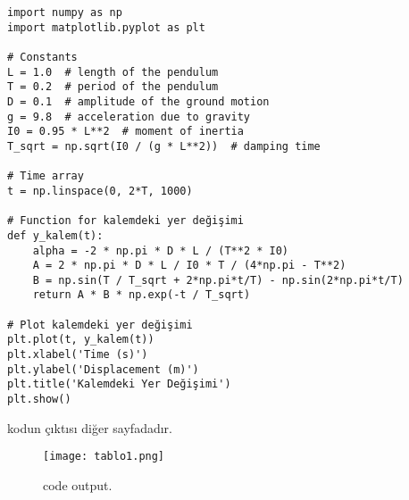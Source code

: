 \documentclass[12pt]{article}
\begin{document}
\begin{verbatim}
import numpy as np
import matplotlib.pyplot as plt

# Constants
L = 1.0  # length of the pendulum
T = 0.2  # period of the pendulum
D = 0.1  # amplitude of the ground motion
g = 9.8  # acceleration due to gravity
I0 = 0.95 * L**2  # moment of inertia
T_sqrt = np.sqrt(I0 / (g * L**2))  # damping time

# Time array
t = np.linspace(0, 2*T, 1000)

# Function for kalemdeki yer değişimi
def y_kalem(t):
    alpha = -2 * np.pi * D * L / (T**2 * I0)
    A = 2 * np.pi * D * L / I0 * T / (4*np.pi - T**2)
    B = np.sin(T / T_sqrt + 2*np.pi*t/T) - np.sin(2*np.pi*t/T)
    return A * B * np.exp(-t / T_sqrt)

# Plot kalemdeki yer değişimi
plt.plot(t, y_kalem(t))
plt.xlabel('Time (s)')
plt.ylabel('Displacement (m)')
plt.title('Kalemdeki Yer Değişimi')
plt.show()
\end{verbatim}

kodun çıktısı diğer sayfadadır.


\begin{figure}
  \texttt{[image: tablo1.png]}
  \caption{code output.}
  \label{fig:tablo1}
\end{figure}
\end{document}
